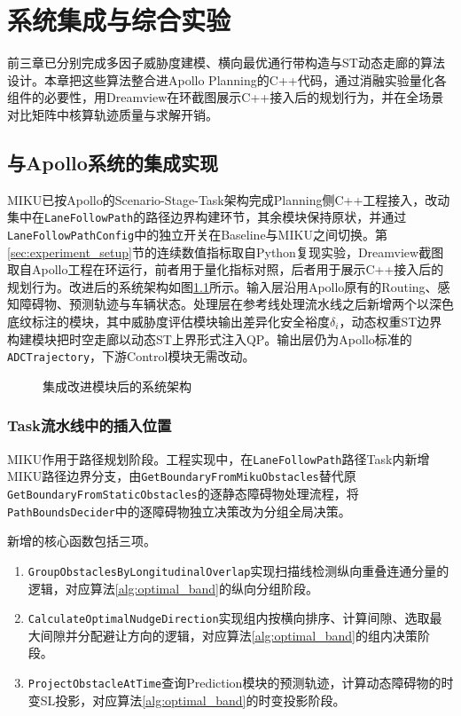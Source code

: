 \chapter{系统集成与综合实验}
\label{chap:integration}

前三章已分别完成多因子威胁度建模、横向最优通行带构造与ST动态走廊的算法设计。本章把这些算法整合进Apollo Planning的C++代码，通过消融实验量化各组件的必要性，用Dreamview在环截图展示C++接入后的规划行为，并在全场景对比矩阵中核算轨迹质量与求解开销。

\section{与Apollo系统的集成实现}
MIKU已按Apollo的Scenario-Stage-Task架构完成Planning侧C++工程接入，改动集中在\texttt{LaneFollowPath}的路径边界构建环节，其余模块保持原状，并通过\texttt{LaneFollowPathConfig}中的独立开关在Baseline与MIKU之间切换。第\ref{sec:experiment_setup}节的连续数值指标取自Python复现实验，Dreamview截图取自Apollo工程在环运行，前者用于量化指标对照，后者用于展示C++接入后的规划行为。改进后的系统架构如图\ref{fig:sys_arch}所示。输入层沿用Apollo原有的Routing、感知障碍物、预测轨迹与车辆状态。处理层在参考线处理流水线之后新增两个以深色底纹标注的模块，其中威胁度评估模块输出差异化安全裕度$\delta_i$，动态权重ST边界构建模块把时空走廊以动态ST上界形式注入QP。输出层仍为Apollo标准的\texttt{ADCTrajectory}，下游Control模块无需改动。

\begin{figure}[H]
\centering
{}
\caption{集成改进模块后的系统架构}
\label{fig:sys_arch}
\end{figure}

\subsection{Task流水线中的插入位置}
MIKU作用于路径规划阶段。工程实现中，在\texttt{LaneFollowPath}路径Task内新增MIKU路径边界分支，由\texttt{GetBoundaryFromMikuObstacles}替代原\texttt{GetBoundaryFromStaticObstacles}的逐静态障碍物处理流程，将\texttt{PathBoundsDecider}中的逐障碍物独立决策改为分组全局决策。

新增的核心函数包括三项。
\begin{enumerate}
\item \texttt{GroupObstaclesByLongitudinalOverlap}\quad{}实现扫描线检测纵向重叠连通分量的逻辑，对应算法\ref{alg:optimal_band}的纵向分组阶段。

\item \texttt{CalculateOptimalNudgeDirection}\quad{}实现组内按横向排序、计算间隙、选取最大间隙并分配避让方向的逻辑，对应算法\ref{alg:optimal_band}的组内决策阶段。

\item \texttt{ProjectObstacleAtTime}\quad{}查询Prediction模块的预测轨迹，计算动态障碍物的时变SL投影，对应算法\ref{alg:optimal_band}的时变投影阶段。
\end{enumerate}

